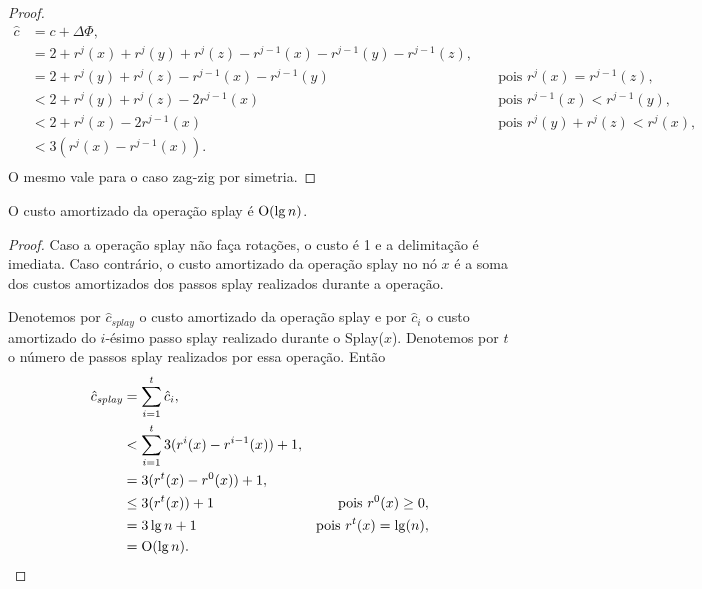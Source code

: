 \begin{proof}
    \begin{align*}
        \hat{c} &= c + \Delta \Phi,\\
        &= 2 + r^{j}(x) + r^{j}(y) + r^{j}(z) - r^{j-1}(x) - r^{j-1}(y) - r^{j-1}(z), \quad & \text{}\\
        &= 2 + r^{j}(y) + r^{j}(z) - r^{j-1}(x) - r^{j-1}(y) \quad & \text{pois $r^{j}(x) = r^{j-1}(z)$},\\
        &< 2 + r^{j}(y) + r^{j}(z) - 2r^{j-1}(x) \quad & \text{pois $r^{j-1}(x) < r^{j-1}(y)$},\\
        &< 2 + r^{j}(x) - 2r^{j-1}(x) \quad & \text{pois $r^{j}(y) + r^{j}(z) < r^{j}(x)$},\\
        &< 3(r^{j}(x) - r^{j-1}(x)). \\
    \end{align*}
    O mesmo vale para o caso zag-zig por simetria.
\end{proof}

\begin{theorem}
    O custo amortizado da operação splay é $\mathrm{O}(\lg n)$.
\end{theorem}

\begin{proof}
    Caso a operação splay não faça rotações, o custo é 1 e a delimitação é imediata. Caso contrário, o custo amortizado da operação splay no nó $x$ é a soma dos custos amortizados dos passos splay realizados durante a operação.

    Denotemos por $\hat{c}_{\textit{splay}}$ o custo amortizado da operação splay e por $\hat{c}_{i}$ o custo amortizado do $i$-ésimo passo splay realizado durante o Splay($x$). Denotemos por $t$ o número de passos splay realizados por essa operação. Então
    \begin{align*}
        \hat{c}_{\textit{splay}} &= \sum_{i = 1}^{t} \hat{c}_{i}, \\
        &< \sum_{i = 1}^{t} {3(r^{i}(x) - r^{i-1}(x)) + 1}, \\
        &= 3(r^{t}(x) - r^{0}(x)) + 1, \\ 
        &\leq 3(r^{t}(x)) + 1 \quad & \text{pois $r^{0}(x) \geq 0$}, \\  
        &= 3\lg n + 1 \quad & \text{pois $r^{t}(x) = \lg(n)$}, \\ 
        &= \mathrm{O}(\lg n).
    \end{align*}
\end{proof}
\newpage

